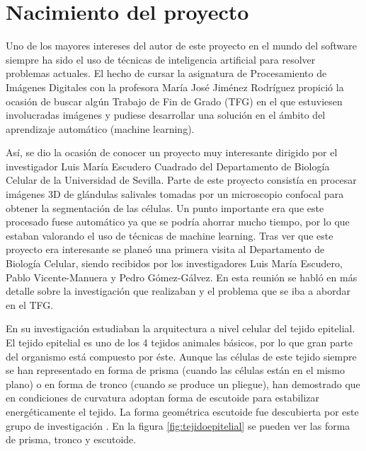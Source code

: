 \chapter{Nacimiento del proyecto}\label{nacimiento}

Uno de los mayores intereses del autor de este proyecto en el mundo del software siempre ha sido el uso de técnicas de inteligencia artificial para resolver problemas actuales. El hecho de cursar la asignatura de Procesamiento de Imágenes Digitales con la profesora María José Jiménez Rodríguez propició la ocasión de buscar algún Trabajo de Fin de Grado (TFG) en el que estuviesen involucradas imágenes y pudiese desarrollar una solución en el ámbito del aprendizaje automático (machine learning).

Así, se dio la ocasión de conocer un proyecto muy interesante dirigido por el investigador Luis María Escudero Cuadrado del Departamento de Biología Celular de la Universidad de Sevilla. Parte de este proyecto consistía en procesar imágenes 3D de glándulas salivales tomadas por un microscopio confocal para obtener la segmentación de las células. Un punto importante era que este procesado fuese automático ya que se podría ahorrar mucho tiempo, por lo que estaban valorando el uso de técnicas de machine learning. Tras ver que este proyecto era interesante se planeó una primera visita al Departamento de Biología Celular, siendo recibidos por los investigadores Luis María Escudero, Pablo Vicente-Manuera y Pedro Gómez-Gálvez. En esta reunión se habló en más detalle sobre la investigación que realizaban y el problema que se iba a abordar en el TFG.

En su investigación estudiaban la arquitectura a nivel celular del tejido epitelial. El tejido epitelial es uno de los 4 tejidos animales básicos, por lo que gran parte del organismo está compuesto por éste. Aunque las células de este tejido siempre se han representado en forma de prisma (cuando las células están en el mismo plano) o en forma de tronco (cuando se produce un pliegue), han demostrado que en condiciones de curvatura adoptan forma de escutoide para estabilizar energéticamente el tejido. La forma geométrica escutoide fue descubierta por este grupo de investigación \cite{GomezGalvez2018}. En la figura \ref{fig:tejidoepitelial} se pueden ver las forma de prisma, tronco y escutoide.


